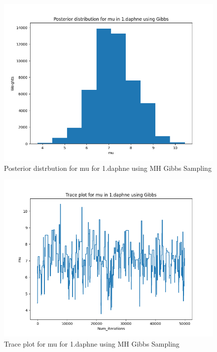 \documentclass{article}
\begin{document}
\begin{enumerate}
\begin{enumerate}
\begin{figure}[!ht]
	\centering
	\includegraphics[scale=0.5]{../figs/Gibbs/posterior_histogram_1_daphne}
	\caption{Posterior distrbution for mu for 1.daphne using MH Gibbs Sampling}
\end{figure}


\begin{figure}[!ht]
	\centering
	\includegraphics[scale=0.5]{../figs/Gibbs/trace_plot_1_daphne}
	\caption{Trace plot for mu for 1.daphne using MH Gibbs Sampling}
\end{figure}



\end{enumerate}
\end{enumerate}
\end{document}
